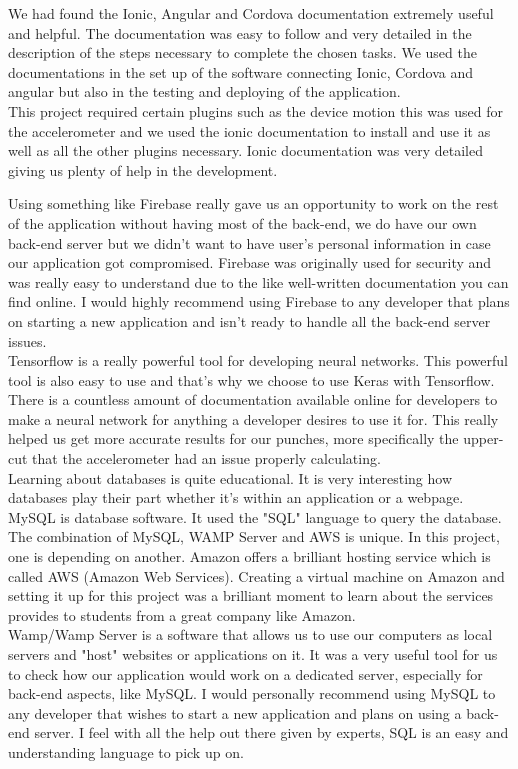 \documentclass[a4paper,12pt]{report}
\begin{document}
We had found the Ionic, Angular and Cordova documentation extremely useful and helpful. 
The documentation was easy to follow and very detailed in the description of the steps necessary to complete the chosen tasks.
We used the documentations in the set up of the software connecting Ionic, Cordova and angular but also in the testing and deploying of the application.\\
This project required certain plugins such as the device motion this was used for the accelerometer and we used the ionic documentation to install and use it as well as all the other plugins necessary.
Ionic documentation was very detailed giving us plenty of help in the development.

Using something like Firebase really gave us an opportunity to work on the rest of the application without having most of the back-end, we do have our own back-end server but we didn't want to have user's personal information in case our application got compromised. Firebase was originally used for security and was really easy to understand due to the like well-written documentation you can find online. I would highly recommend using Firebase to any developer that plans on starting a new application and isn't ready to handle all the back-end server issues. \\

Tensorflow is a really powerful tool for developing neural networks. This powerful tool is also easy to use and that's why we choose to use Keras with Tensorflow. There is a countless amount of documentation available online for developers to make a neural network for anything a developer desires to use it for. This really helped us get more accurate results for our punches, more specifically the upper-cut that the accelerometer had an issue properly calculating.\\

Learning about databases is quite educational. It is very interesting how databases play their part whether it's within an application or a webpage. MySQL is database software. It used the "SQL" language to query the database. The combination of MySQL, WAMP Server and AWS is unique. In this project, one is depending on another. Amazon offers a brilliant hosting service which is called AWS (Amazon Web Services). Creating a virtual machine on Amazon and setting it up for this project was a brilliant moment to learn about the services provides to students from a great company like Amazon.\\
Wamp/Wamp Server is a software that allows us to use our computers as local servers and "host" websites or applications on it. It was a very useful tool for us to check how our application would work on a dedicated server, especially for back-end aspects, like MySQL.
I would personally recommend using MySQL to any developer that wishes to start a new application and plans on using a back-end server. I feel with all the help out there given by experts, SQL is an easy and understanding language to pick up on.
\end{document}
